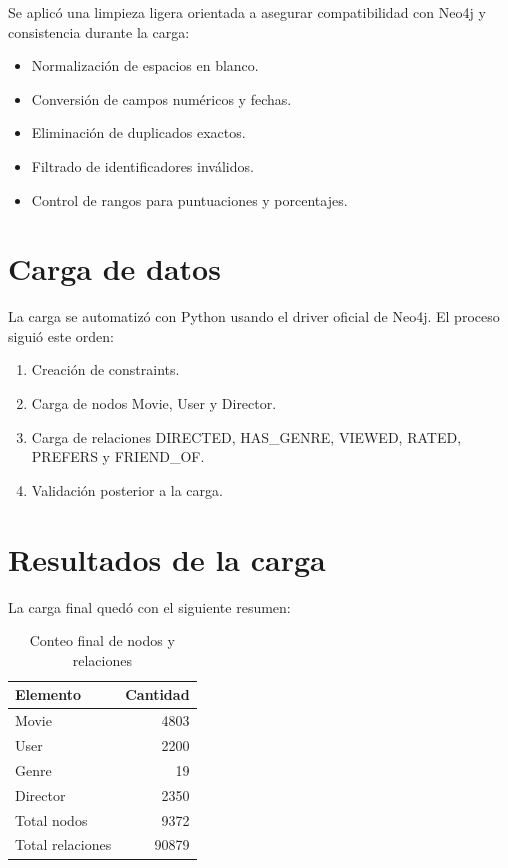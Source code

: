 \documentclass[12pt,a4paper]{article}
\begin{document}
Se aplicó una limpieza ligera orientada a asegurar compatibilidad con Neo4j y consistencia durante la carga:

\begin{itemize}
    \item Normalización de espacios en blanco.
    \item Conversión de campos numéricos y fechas.
    \item Eliminación de duplicados exactos.
    \item Filtrado de identificadores inválidos.
    \item Control de rangos para puntuaciones y porcentajes.
\end{itemize}

\section{Carga de datos}

La carga se automatizó con Python usando el driver oficial de Neo4j. El proceso siguió este orden:

\begin{enumerate}
    \item Creación de constraints.
    \item Carga de nodos Movie, User y Director.
    \item Carga de relaciones DIRECTED, HAS\_GENRE, VIEWED, RATED, PREFERS y FRIEND\_OF.
    \item Validación posterior a la carga.
\end{enumerate}

\section{Resultados de la carga}

La carga final quedó con el siguiente resumen:

\begin{table}[H]
\centering
\begin{tabular}{lr}
\toprule
\textbf{Elemento} & \textbf{Cantidad} \\
\midrule
Movie & 4803 \\
User & 2200 \\
Genre & 19 \\
Director & 2350 \\
\midrule
Total nodos & 9372 \\
Total relaciones & 90879 \\
\bottomrule
\end{tabular}
\caption{Conteo final de nodos y relaciones}
\end{table}
\end{document}

